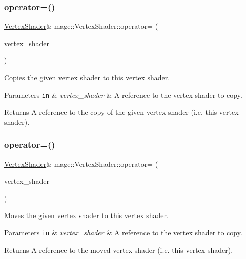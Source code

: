 \subsubsection{\texorpdfstring{operator=()}{operator=()}\hspace{0.1cm}{\footnotesize\ttfamily [1/2]}}
{\footnotesize\ttfamily \hyperlink{classmage_1_1_vertex_shader}{Vertex\+Shader}\& mage\+::\+Vertex\+Shader\+::operator= (\begin{DoxyParamCaption}\item[{const \hyperlink{classmage_1_1_vertex_shader}{Vertex\+Shader} \&}]{vertex\+\_\+shader }\end{DoxyParamCaption})\hspace{0.3cm}{\ttfamily [delete]}}

Copies the given vertex shader to this vertex shader.


\begin{DoxyParams}[1]{Parameters}
\mbox{\tt in}  & {\em vertex\+\_\+shader} & A reference to the vertex shader to copy. \\
\hline
\end{DoxyParams}
\begin{DoxyReturn}{Returns}
A reference to the copy of the given vertex shader (i.\+e. this vertex shader). 
\end{DoxyReturn}
\hypertarget{classmage_1_1_vertex_shader_ada6250a89610e5649e0062c9a50fb78a}{}\label{classmage_1_1_vertex_shader_ada6250a89610e5649e0062c9a50fb78a} 
\subsubsection{\texorpdfstring{operator=()}{operator=()}\hspace{0.1cm}{\footnotesize\ttfamily [2/2]}}
{\footnotesize\ttfamily \hyperlink{classmage_1_1_vertex_shader}{Vertex\+Shader}\& mage\+::\+Vertex\+Shader\+::operator= (\begin{DoxyParamCaption}\item[{\hyperlink{classmage_1_1_vertex_shader}{Vertex\+Shader} \&\&}]{vertex\+\_\+shader }\end{DoxyParamCaption})\hspace{0.3cm}{\ttfamily [delete]}}

Moves the given vertex shader to this vertex shader.


\begin{DoxyParams}[1]{Parameters}
\mbox{\tt in}  & {\em vertex\+\_\+shader} & A reference to the vertex shader to copy. \\
\hline
\end{DoxyParams}
\begin{DoxyReturn}{Returns}
A reference to the moved vertex shader (i.\+e. this vertex shader). 
\end{DoxyReturn}
\hypertarget{classmage_1_1_vertex_shader_a53f4b25241f6c5739724d421c9f29a36}{}\label{classmage_1_1_vertex_shader_a53f4b25241f6c5739724d421c9f29a36} 
